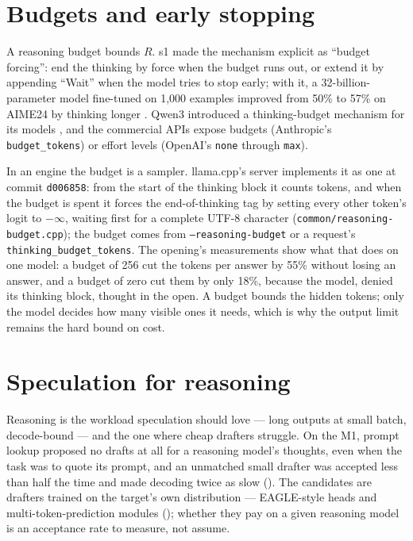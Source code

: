 \section{Budgets and early stopping}

A reasoning budget bounds $R$. s1 made the mechanism explicit as ``budget
forcing'': end the thinking by force when the budget runs out, or extend it by
appending ``Wait'' when the model tries to stop early; with it, a
32-billion-parameter model fine-tuned on 1,000 examples improved from 50\% to 57\% on
AIME24 by thinking longer \cite{muennighoff2025s1}. Qwen3 introduced a
thinking-budget mechanism for its models \cite{yang2025qwen3}, and the commercial APIs
expose budgets (Anthropic's \texttt{budget\_tokens}) or effort levels
(OpenAI's \texttt{none} through \texttt{max}).

In an engine the budget is a sampler. llama.cpp's server implements it as one
at commit \texttt{d006858}: from the start of the thinking block it counts
tokens, and when the budget is spent it forces the end-of-thinking tag by
setting every other token's logit to $-\infty$, waiting first for a complete
UTF-8 character (\texttt{common/reasoning-budget.cpp}); the budget comes from
\texttt{--reasoning-budget} or a request's \texttt{thinking\_budget\_tokens}.
The opening's measurements show what that does on one model: a budget of 256
cut the tokens per answer by 55\% without losing an answer, and a budget of
zero cut them by only 18\%, because the model, denied its thinking block,
thought in the open. A budget bounds the hidden tokens; only the model decides
how many visible ones it needs, which is why the output limit remains the hard
bound on cost.

\section{Speculation for reasoning}

Reasoning is the workload speculation should love --- long outputs at small
batch, decode-bound --- and the one where cheap drafters struggle. On the M1,
prompt lookup proposed no drafts at all for a reasoning model's thoughts, even
when the task was to quote its prompt, and an unmatched small drafter was
accepted less than half the time and made decoding twice as slow
(). The candidates are drafters trained on the
target's own distribution --- EAGLE-style heads and multi-token-prediction
modules (); whether they pay on a given reasoning
model is an acceptance rate to measure, not assume.

